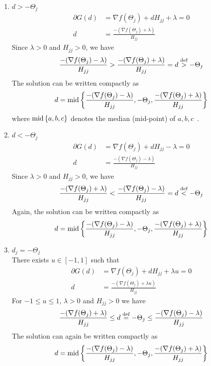 \begin{enumerate}
	\item $d > -\Theta_j$
	\begin{align}
	\partial G(d) & = \nabla f(\Theta_{j}) + d H_{j j} + \lambda = 0 \nonumber \\
	d & = \frac{-(\nabla f(\Theta_{j}) + \lambda)}{H_{j j}}  \nonumber
	\end{align}
	Since $\lambda>0$ and $H_{jj}>0$, we have
	\begin{equation*}
	\frac{-(\nabla f(\Theta_{j}) - \lambda)}{H_{j j}} > \frac{-(\nabla f(\Theta_{j}) + \lambda)}{H_{j j}} = d \overset{\textrm{{def}}}{>} -\Theta_j
	\end{equation*}
	The solution can be written compactly as
	\begin{equation*}
	d = \textrm{{mid}}\left\lbrace \frac{-(\nabla f(\Theta_{j}) - \lambda)}{H_{j j}}, -\Theta_j ,\frac{-(\nabla f(\Theta_{j}) + \lambda)}{H_{j j}} \right\rbrace
	\end{equation*}
	where $\textrm{{mid}}\left\lbrace a,b,c \right\rbrace$ denotes the median (mid-point) of $a,b,c$~\citep{tseng2009coordinate}.
	\item $d < -\Theta_j$
	\begin{align}
	\partial G(d) & = \nabla f(\Theta_{j}) + d H_{j j} - \lambda = 0 \nonumber \\
	d & = \frac{-(\nabla f(\Theta_{j}) - \lambda)}{H_{j j}}  \nonumber
	\end{align}
	Since $\lambda>0$ and $H_{jj}>0$, we have
	\begin{equation*}
	\frac{-(\nabla f(\Theta_{j}) + \lambda)}{H_{j j}} < \frac{-(\nabla f(\Theta_{j}) - \lambda)}{H_{j j}} = d \overset{\textrm{{def}}}{<} -\Theta_j
	\end{equation*}
	Again, the solution can be written compactly as
	\begin{equation*}
	d = \textrm{{mid}}\left\lbrace \frac{-(\nabla f(\Theta_{j}) - \lambda)}{H_{j j}}, -\Theta_j ,\frac{-(\nabla f(\Theta_{j}) + \lambda)}{H_{j j}} \right\rbrace
	\end{equation*}
	
	\item $d_j = -\Theta_j$\\
	There exists $u \in [-1,1]$ such that
	\begin{align*}
	\partial G(d) & = \nabla f(\Theta_{j}) + d H_{j j} + \lambda u = 0 \nonumber \\
	d & = \frac{-(\nabla f(\Theta_{j}) + \lambda u)}{H_{j j}}  \nonumber
	\end{align*}
	For $-1 \leq u \leq 1$, $\lambda>0$ and $H_{jj}>0$ we have
	\begin{equation*}
	\frac{-(\nabla f(\Theta_{j}) + \lambda)}{H_{j j}} \leq  d \overset{\textrm{{def}}}{=} -\Theta_j \leq \frac{-(\nabla f(\Theta_{j}) - \lambda)}{H_{j j}}
	\end{equation*}
	The solution can again be written compactly as
	\begin{equation*}
	d = \textrm{{mid}}\left\lbrace \frac{-(\nabla f(\Theta_{j}) - \lambda)}{H_{j j}}, -\Theta_j ,\frac{-(\nabla f(\Theta_{j}) + \lambda)}{H_{j j}} \right\rbrace
	\end{equation*}
	
\end{enumerate}
